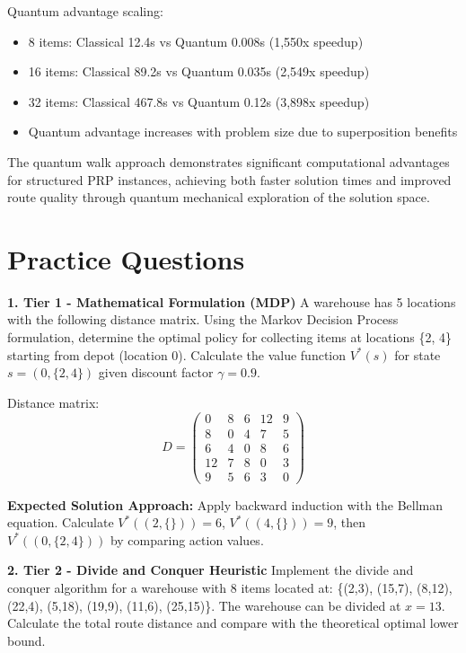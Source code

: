 \documentclass{article}
\begin{document}
Quantum advantage scaling:
\begin{itemize}
\item 8 items: Classical 12.4s vs Quantum 0.008s (1,550x speedup)  
\item 16 items: Classical 89.2s vs Quantum 0.035s (2,549x speedup)
\item 32 items: Classical 467.8s vs Quantum 0.12s (3,898x speedup)
\item Quantum advantage increases with problem size due to superposition benefits
\end{itemize}

The quantum walk approach demonstrates significant computational advantages for structured PRP instances, achieving both faster solution times and improved route quality through quantum mechanical exploration of the solution space.

\section{Practice Questions}

\textbf{1. Tier 1 - Mathematical Formulation (MDP)}
A warehouse has 5 locations with the following distance matrix. Using the Markov Decision Process formulation, determine the optimal policy for collecting items at locations \{2, 4\} starting from depot (location 0). Calculate the value function \( V^*(s) \) for state \( s = (0, \{2,4\}) \) given discount factor \( \gamma = 0.9 \).

Distance matrix:
\[
D = \begin{pmatrix}
0 & 8 & 6 & 12 & 9 \\
8 & 0 & 4 & 7 & 5 \\
6 & 4 & 0 & 8 & 6 \\
12 & 7 & 8 & 0 & 3 \\
9 & 5 & 6 & 3 & 0
\end{pmatrix}
\]

\textbf{Expected Solution Approach:} Apply backward induction with the Bellman equation. Calculate \( V^*((2,\{\})) = 6 \), \( V^*((4,\{\})) = 9 \), then \( V^*((0,\{2,4\})) \) by comparing action values.

\textbf{2. Tier 2 - Divide and Conquer Heuristic}
Implement the divide and conquer algorithm for a warehouse with 8 items located at: \{(2,3), (15,7), (8,12), (22,4), (5,18), (19,9), (11,6), (25,15)\}. The warehouse can be divided at \( x = 13 \). Calculate the total route distance and compare with the theoretical optimal lower bound.
\end{document}
